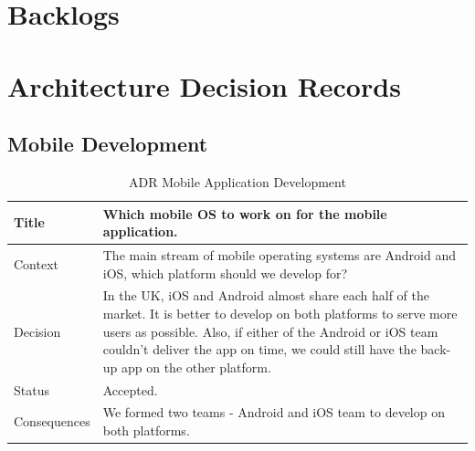 \documentclass[12pt,a4paper]{article}
\begin{document}
    \begin{appendices}                  
      \section{Backlogs}\label{appendix:backlogs}
        
          
      \section{Architecture Decision Records}\label{appendix:Architecture Decision Records}
        \subsection{Mobile Development}
          \begin{table}[H]
            \centering
              \begin{tabularx}{\textwidth}{l X}
                \hline
                Title & Which mobile OS to work on for the mobile application. \\ \hline
                Context & The main stream of mobile operating systems are Android and iOS, which platform should we develop for?\\ 
                Decision & In the UK, iOS and Android almost share each half of the market. It is better to develop on both platforms to serve more users as possible. Also, if either of the Android or iOS team couldn't deliver the app on time, we could still have the back-up app on the other platform. \\ 
                Status & Accepted.\\ 
                Consequences & We formed two teams - Android and iOS team to develop on both platforms.  \\                  
                \hline
              \end{tabularx}
              \caption[Table caption text]{ADR Mobile Application Development}
              \label{table:ADR Mobile Application Development}
          \end{table}


\end{appendices}
\end{document}

